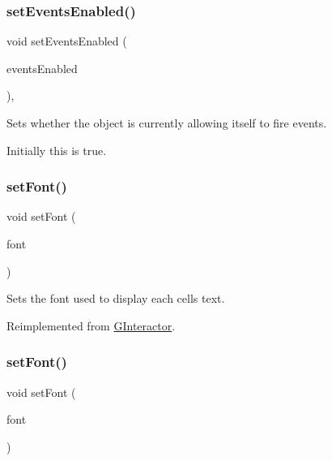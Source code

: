 \subsubsection{\texorpdfstring{set\+Events\+Enabled()}{setEventsEnabled()}}
{\footnotesize\ttfamily void set\+Events\+Enabled (\begin{DoxyParamCaption}\item[{bool}]{events\+Enabled }\end{DoxyParamCaption})\hspace{0.3cm}{\ttfamily [virtual]}, {\ttfamily [inherited]}}



Sets whether the object is currently allowing itself to fire events. 

Initially this is true. \mbox{\label{classGTable_a2d22014c7fa3bccfd58c982aea1b55fa}} 
\subsubsection{\texorpdfstring{set\+Font()}{setFont()}\hspace{0.1cm}{\footnotesize\ttfamily [1/2]}}
{\footnotesize\ttfamily void set\+Font (\begin{DoxyParamCaption}\item[{const Q\+Font \&}]{font }\end{DoxyParamCaption})\hspace{0.3cm}{\ttfamily [virtual]}}



Sets the font used to display each cell\textquotesingle{}s text. 



Reimplemented from \mbox{\hyperlink{classGInteractor_a2592348886ffea646c6534bf88f7c49d}{G\+Interactor}}.

\mbox{\label{classGTable_ab39ef411fb13a52852ddd138c5932e2e}} 
\subsubsection{\texorpdfstring{set\+Font()}{setFont()}\hspace{0.1cm}{\footnotesize\ttfamily [2/2]}}
{\footnotesize\ttfamily void set\+Font (\begin{DoxyParamCaption}\item[{const std\+::string \&}]{font }\end{DoxyParamCaption})\hspace{0.3cm}{\ttfamily [virtual]}}



